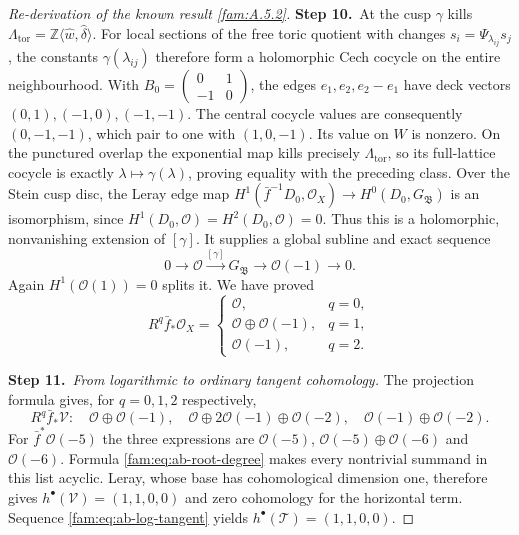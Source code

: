 \documentclass[11pt,a4paper]{article}
\theoremstyle{plain}
\theoremstyle{definition}
\begin{document}
\begin{proof}[Re-derivation of the known result \ref{fam:A.5.2}]
\par\smallskip\noindent\textbf{Step 10.}\ At the cusp $\gamma$ kills
$\Lambda_{\mathrm{tor}}=\mathbb Z\langle\widehat w,\widehat\delta\rangle$.
For local sections of the free toric quotient with changes
$s_i=\Psi_{\lambda_{ij}}s_j$, the constants
$\gamma(\lambda_{ij})$ therefore form a holomorphic Cech cocycle
on the entire neighbourhood. With
$B_0=\left(\begin{smallmatrix}0&1\\-1&0\end{smallmatrix}\right)$,
the edges $e_1,e_2,e_2-e_1$ have deck vectors
$(0,1),(-1,0),(-1,-1)$. The central cocycle values are consequently
$(0,-1,-1)$, which pair to one with $(1,0,-1)$.
Its value on $W$ is nonzero. On the punctured overlap the exponential
map kills precisely $\Lambda_{\mathrm{tor}}$, so its full-lattice
cocycle is exactly $\lambda\mapsto\gamma(\lambda)$, proving equality
with the preceding class. Over the Stein cusp disc, the Leray edge
map $H^1(\bar f^{-1}D_0,\mathcal O_X)\to H^0(D_0,G_{\mathfrak B})$ is an
isomorphism, since $H^1(D_0,\mathcal O)=H^2(D_0,\mathcal O)=0$.
Thus this is a holomorphic, nonvanishing extension of $[\gamma]$.
It supplies a global subline and exact sequence
\[
 0\longrightarrow\mathcal O\xrightarrow{[\gamma]}G_{\mathfrak B}
 \longrightarrow\mathcal O(-1)\longrightarrow0.
\]
Again $H^1(\mathcal O(1))=0$ splits it. We have proved
\begin{equation}\label{fam:eq:ab-direct-images}
 R^q\bar f_*\mathcal O_X=
 \begin{cases}
 \mathcal O,&q=0,\\
 \mathcal O\oplus\mathcal O(-1),&q=1,\\
 \mathcal O(-1),&q=2.
 \end{cases}
\end{equation}

\par\smallskip\noindent\textbf{Step 11.}\ \emph{From logarithmic to ordinary tangent cohomology.}
The projection formula gives, for $q=0,1,2$ respectively,
\[
 R^q\bar f_*\mathcal V:
 \quad\mathcal O\oplus\mathcal O(-1),\quad
 \mathcal O\oplus2\mathcal O(-1)\oplus\mathcal O(-2),\quad
 \mathcal O(-1)\oplus\mathcal O(-2).
\]
For $\bar f^*\mathcal O(-5)$ the three expressions are
$\mathcal O(-5)$, $\mathcal O(-5)\oplus\mathcal O(-6)$ and
$\mathcal O(-6)$. Formula \eqref{fam:eq:ab-root-degree} makes every
nontrivial summand in this list acyclic. Leray, whose base has
cohomological dimension one, therefore gives
$h^\bullet(\mathcal V)=(1,1,0,0)$ and zero cohomology for the
horizontal term. Sequence \eqref{fam:eq:ab-log-tangent} yields
$h^\bullet(\mathcal T)=(1,1,0,0)$.


\end{proof}
\end{document}
